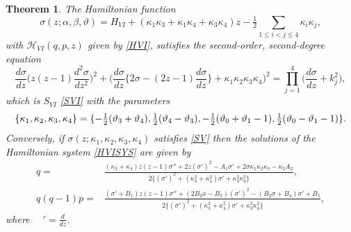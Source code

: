 \documentclass[12pt]{article}
\newtheorem{mydef}{Theorem}[section]
\numberwithin{figure}{section}
\numberwithin{equation}{section}
\numberwithin{table}{section}
\begin{document}
\begin{mydef} The Hamiltonian function
\begin{equation}
\sigma(z;\alpha,\beta,\vartheta)=H_{VI}+(\kappa_1\kappa_3+\kappa_1\kappa_4+\kappa_3\kappa_4)z-\tfrac{1}{2}\!\!\!\!\!\!\sum_{1\leq i<j\leq4}\!\!\!\!\!\kappa_i\kappa_j,\label{HA6}
\end{equation}
with $\mathcal{H}_{VI}(q,p,z)$ given by \eqref{HVI}, satisfies the second-order, second-degree equation
$$
\frac{d\sigma}{dz}\bigg(z(z-1)\frac{d^2\sigma}{dz^2}\bigg)^2+\bigg(\frac{d\sigma}{dz}\bigg\{2\sigma-(2z-1)\frac{d\sigma}{dz}\bigg\}+\kappa_1\kappa_2\kappa_3\kappa_4\bigg)^2
=\prod^4_{j=1}\bigg(\frac{d\sigma}{dz}+k_j^2\bigg),
$$
which is $S_{VI}$ \eqref{SVI} with the parameters
$$
\{\kappa_1,\kappa_2,\kappa_3,\kappa_4\}=\{-\tfrac{1}{2}(\vartheta_3+\vartheta_4),\tfrac{1}{2}(\vartheta_4-\vartheta_3),-\tfrac{1}{2}(\vartheta_0+\vartheta_1-1),\tfrac{1}{2}(\vartheta_0-\vartheta_1-1)\}.
$$
Conversely, if $\sigma(z;\kappa_1,\kappa_2,\kappa_3,\kappa_4)$ satisfies \eqref{SV} then the solutions of the Hamiltonian system \eqref{HVISYS} are given by
\begin{align}\nonumber
q=&\frac{(\kappa_3+\kappa_4)z(z-1)\sigma''+2z(\sigma')^2-A_1\sigma'+2\sigma\kappa_1\kappa_2\kappa_3
-\kappa_2A_2}{2\big\{(\sigma')^2+(\kappa_3^2+\kappa_4^2)\sigma'+\kappa_3^2\kappa_4^2\big\}},\\\label{PVIpandq}
q(q-1)p=&\frac{(\sigma'+B_1)z(z-1)\sigma''+(2B_2x-B_3)(\sigma')^2-(B_2\sigma+B_4)\sigma'+B_5}{2\big\{(\sigma')^2+(\kappa_3^2+\kappa_4^2)\sigma'+\kappa_3^2\kappa_4^2\big\}},
\end{align}
where $\quad'=\frac{d}{dz}$.
\end{mydef}
\end{document}

